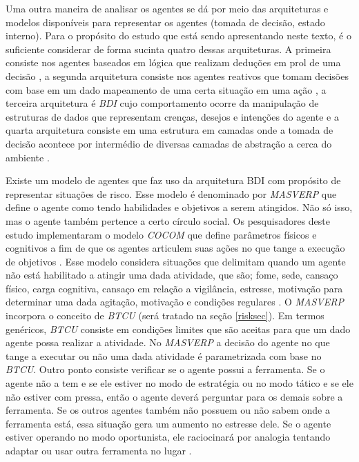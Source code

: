 Uma outra maneira de analisar os agentes se dá por meio das arquiteturas e modelos disponíveis para representar os agentes (tomada de decisão, estado interno). Para o propósito do estudo que está sendo apresentando neste texto, é o suficiente considerar de forma sucinta quatro dessas arquiteturas. A primeira consiste nos agentes baseados em lógica que realizam deduções em prol de uma decisão \cite{logicagent}, a segunda arquitetura consiste nos agentes reativos que tomam decisões com base em um dado mapeamento de uma certa situação em uma  ação \cite{reactiveagent}, a terceira arquitetura é \textit{BDI} cujo comportamento ocorre da manipulação de estruturas de dados que representam crenças, desejos e intenções do agente \cite{bdi} e a quarta arquitetura consiste em uma estrutura 
em camadas onde a tomada de decisão acontece por intermédio de diversas camadas de abstração a cerca do ambiente \cite{layeragent} \cite{whatisagent}.  

Existe um modelo de agentes que faz uso da arquitetura BDI com propósito de representar situações de risco. Esse modelo é denominado por    \textit{MASVERP} que define o agente como tendo habilidades e objetivos a serem atingidos. Não só isso, mas o agente também pertence a certo círculo social. Os pesquisadores deste estudo implementaram o modelo \textit{COCOM} que define parâmetros físicos e cognitivos a fim de que os agentes articulem suas ações no que tange a execução de objetivos \cite{mavesp}. Esse modelo considera situações que delimitam quando um agente não está habilitado a atingir uma dada atividade, que são; fome, sede, cansaço físico, carga cognitiva, cansaço em relação a vigilância, estresse, motivação para determinar uma dada agitação, motivação e condições regulares \cite{mavesp}. O \textit{MASVERP} incorpora o conceito de \textit{BTCU} (será tratado na seção \ref{risksec}). Em termos genéricos, \textit{BTCU} 
consiste em condições limites que são aceitas para que um dado agente possa realizar a atividade. No \textit{MASVERP} a decisão do agente no que tange a executar ou não uma dada atividade é parametrizada com base no \textit{BTCU}. Outro ponto consiste verificar se o agente possui a ferramenta. Se o agente não a tem e se ele estiver no modo de estratégia ou no modo tático e se ele não estiver com pressa, então o agente deverá perguntar para os demais sobre a ferramenta. Se os outros agentes também não possuem ou não sabem onde a ferramenta está, essa situação gera um aumento no estresse dele. Se o agente estiver operando no modo oportunista, ele raciocinará por analogia tentando adaptar ou usar outra ferramenta no lugar \cite{mavesp}. 